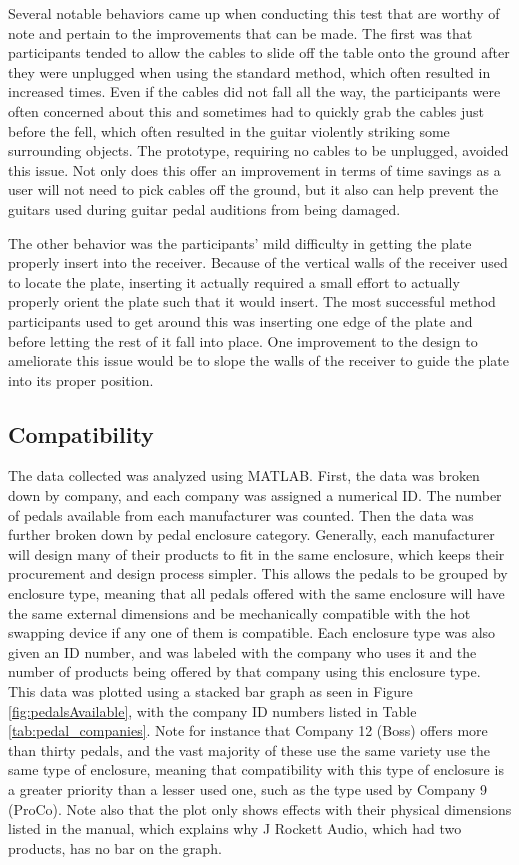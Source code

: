 \documentclass{article}
\begin{document}
	Several notable behaviors came up when conducting this test that are worthy of note and pertain to the improvements that can be made.  The first was that participants tended to allow the cables to slide off the table onto the ground after they were unplugged when using the standard method, which often resulted in increased times.  Even if the cables did not fall all the way, the participants were often concerned about this and sometimes had to quickly grab the cables just before the fell, which often resulted in the guitar violently striking some surrounding objects.  The prototype, requiring no cables to be unplugged, avoided this issue.  Not only does this offer an improvement in terms of time savings as a user will not need to pick cables off the ground, but it also can help prevent the guitars used during guitar pedal auditions from being damaged.

	The other behavior was the participants' mild difficulty in getting the plate properly insert into the receiver.  Because of the vertical walls of the receiver used to locate the plate, inserting it actually required a small effort to actually properly orient the plate such that it would insert.  The most successful method participants used to get around this was inserting one edge of the plate and before letting the rest of it fall into place.  One improvement to the design to ameliorate this issue would be to slope the walls of the receiver to guide the plate into its proper position.

	\color{gray}

	\subsection{Compatibility}
	The data collected was analyzed using MATLAB.  First, the data was broken down by company, and each company was assigned a numerical ID.  The number of pedals available from each manufacturer was counted.  Then the data was further broken down by pedal enclosure category.  Generally, each manufacturer will design many of their products to fit in the same enclosure, which keeps their procurement and design process simpler.  This allows the pedals to be grouped by enclosure type, meaning that all pedals offered with the same enclosure will have the same external dimensions and be mechanically compatible with the hot swapping device if any one of them is compatible.  Each enclosure type was also given an ID number, and was labeled with the company who uses it and the number of products being offered by that company using this enclosure type.  This data was plotted using a stacked bar graph as seen in Figure \ref{fig:pedalsAvailable}, with the company ID numbers listed in Table \ref{tab:pedal_companies}.  Note for instance that Company 12 (Boss) offers more than thirty pedals, and the vast majority of these use the same variety use the same type of enclosure, meaning that compatibility with this type of enclosure is a greater priority than a lesser used one, such as the type used by Company 9 (ProCo).  Note also that the plot only shows effects with their physical dimensions listed in the manual, which explains why J Rockett Audio, which had two products, has no bar on the graph.
\end{document}
